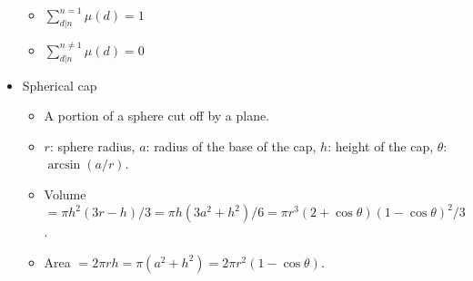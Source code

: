 \documentclass[10pt, a4paper, twocolumn, oneside]{article}
\begin{document}
\begin{itemize}
\begin{itemize}
  \item $\sum_{d \vert n}^{n=1} \mu (d)  = 1$
  \item $\sum_{d \vert n}^{n \neq 1} \mu (d)  = 0$
\end{itemize}
\item Spherical cap
\begin{itemize}
    \itemsep-0.5em
  \item A portion of a sphere cut off by a plane.
  \item $r$: sphere radius, $a$: radius of the base of the cap, $h$: height of the cap, $\theta$: $\arcsin(a/r)$.
  \item Volume $=\pi h^2(3r-h)/3=\pi h(3a^2+h^2)/6=\pi r^3(2+\cos\theta)(1-\cos\theta)^2/3$.
  \item Area $=2\pi rh=\pi(a^2+h^2)=2\pi r^2(1-\cos\theta)$.
\end{itemize}
\end{itemize}
\end{document}
